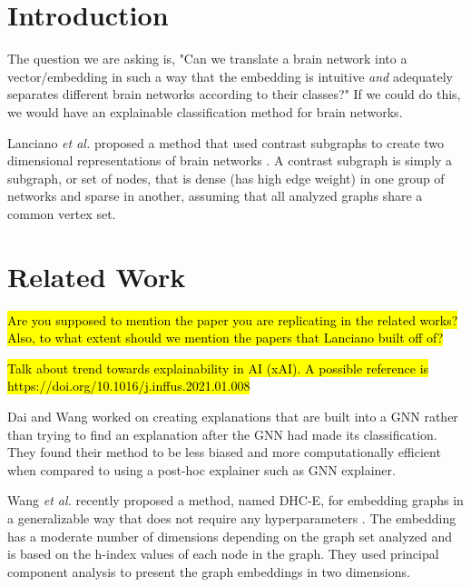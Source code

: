 \documentclass[sigconf]{acmart}
\begin{document}

\maketitle

\section{Introduction} \label{intro}

The question we are asking is, "Can we translate a brain network into a vector/embedding in such a way that the embedding is intuitive \emph{and} adequately separates different brain networks according to their classes?"
If we could do this, we would have an explainable classification method for brain networks.

Lanciano \emph{et al.} proposed a method that used contrast subgraphs to create two dimensional representations of brain networks \cite{lanciano2020}.
A contrast subgraph is simply a subgraph, or set of nodes, that is dense (has high edge weight) in one group of networks and sparse in another, assuming that all analyzed graphs share a common vertex set.

\section{Related Work} \label{related-work}

\hl{Are you supposed to mention the paper you are replicating in the related works? Also, to what extent should we mention the papers that Lanciano built off of?}

\hl{Talk about trend towards explainability in AI (xAI). A possible reference is https://doi.org/10.1016/j.inffus.2021.01.008}

Dai and Wang worked on creating explanations that are built into a GNN \cite{dai2021} rather than trying to find an explanation after the GNN had made its classification.
They found their method to be less biased and more computationally efficient when compared to using a post-hoc explainer such as GNN explainer.

Wang \emph{et al.} recently proposed a method, named DHC-E, for embedding graphs in a generalizable way that does not require any hyperparameters \cite{wang2021}. The embedding has a moderate number of dimensions depending on the graph set analyzed and is based on the h-index values of each node in the graph. They used principal component analysis to present the graph embeddings in two dimensions.
\end{document}
